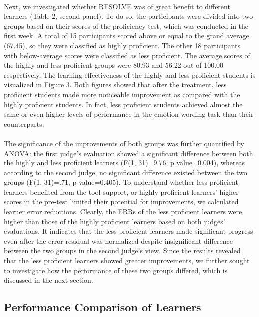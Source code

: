 \documentclass[a4paper,12pt,oneside]{article}
\begin{document}
\paragraph{}
Next, we investigated whether RESOLVE was of great benefit to different learners (Table 2, second panel). To do so, the participants were divided into two groups based on their scores of the proficiency test, which was conducted in the first week. A total of 15 participants scored above or equal to the grand average (67.45), so they were classified as highly proficient. The other 18 participants with below-average scores were classified as less proficient. The average scores of the highly and less proficient groups were 80.93 and 56.22 out of 100.00 respectively. The learning effectiveness of the highly and less proficient students is visualized in Figure 3. Both figures showed that after the treatment, less proficient students made more noticeable improvement as compared with the highly proficient students. In fact, less proficient students achieved almost the same or even higher levels of performance in the emotion wording task than their counterparts. 
\paragraph{}
The significance of the improvements of both groups was further quantified by ANOVA: the first judge’s evaluation showed a significant difference between both the highly and less proficient learners (F(1, 31)=9.76, p value=0.004), whereas according to the second judge, no significant difference existed between the two groups (F(1, 31)=.71, p value=0.405). To understand whether less proficient learners benefited from the tool support, or highly proficient learners’ higher scores in the pre-test limited their potential for improvements, we calculated learner error reductions. Clearly, the ERRs of the less proficient learners were higher than those of the highly proficient learners based on both judges’ evaluations. It indicates that the less proficient learners made significant progress even after the error residual was normalized despite insignificant difference between the two groups in the second judge’s view. Since the results revealed that the less proficient learners showed greater improvements, we further sought to investigate how the performance of these two groups differed, which is discussed in the next section. 
\subsection{Performance Comparison of Learners}
\end{document}
